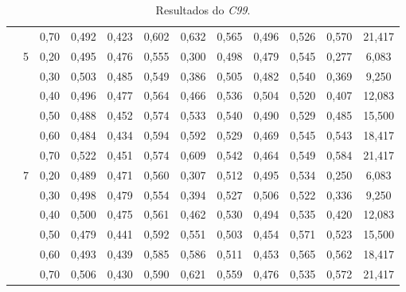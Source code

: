 \begin{table}[!h]
\begin{tabular}{|c|c|c||c|c|c|c||c|c|c|c||c|}
	 && 0,70    & 0,492 & 0,423 & 0,602 & 0,632         &     0,565 &  0,496 & 0,526 & 0,570 & 21,417              \\ \cline{2-12}  
& \multirow{6}{*}{5}                                                                                                                
	  & 0,20    & 0,495 & 0,476 & 0,555 & 0,300         &     0,498 &  0,479 & 0,545 & 0,277 & 6,083               \\ \cline{3-12}  
	 && 0,30    & 0,503 & 0,485 & 0,549 & 0,386         &     0,505 &  0,482 & 0,540 & 0,369 & 9,250               \\ \cline{3-12}  
	 && 0,40    & 0,496 & 0,477 & 0,564 & 0,466         &     0,536 &  0,504 & 0,520 & 0,407 & 12,083              \\ \cline{3-12}  
	 && 0,50    & 0,488 & 0,452 & 0,574 & 0,533         &     0,540 &  0,490 & 0,529 & 0,485 & 15,500              \\ \cline{3-12}  
	 && 0,60    & 0,484 & 0,434 & 0,594 & 0,592         &     0,529 &  0,469 & 0,545 & 0,543 & 18,417              \\ \cline{3-12}  
	 && 0,70    & 0,522 & 0,451 & 0,574 & 0,609         &     0,542 &  0,464 & 0,549 & 0,584 & 21,417              \\ \cline{2-12}  
& \multirow{6}{*}{7}                                                                                                                
	  & 0,20    & 0,489 & 0,471 & 0,560 & 0,307         &     0,512 &  0,495 & 0,534 & 0,250 & 6,083               \\ \cline{3-12}  
	 && 0,30    & 0,498 & 0,479 & 0,554 & 0,394         &     0,527 &  0,506 & 0,522 & 0,336 & 9,250               \\ \cline{3-12}  
	 && 0,40    & 0,500 & 0,475 & 0,561 & 0,462         &     0,530 &  0,494 & 0,535 & 0,420 & 12,083              \\ \cline{3-12}  
	 && 0,50    & 0,479 & 0,441 & 0,592 & 0,551         &     0,503 &  0,454 & 0,571 & 0,523 & 15,500              \\ \cline{3-12}  
	 && 0,60    & 0,493 & 0,439 & 0,585 & 0,586         &     0,511 &  0,453 & 0,565 & 0,562 & 18,417              \\ \cline{3-12}  
	 && 0,70    & 0,506 & 0,430 & 0,590 & 0,621         &     0,559 &  0,476 & 0,535 & 0,572 & 21,417              \\ \hline      
 \end{tabular}  
 \caption{Resultados do \textit{C99}.}
 \label{tab:resultadosc99}
\end{table} 



